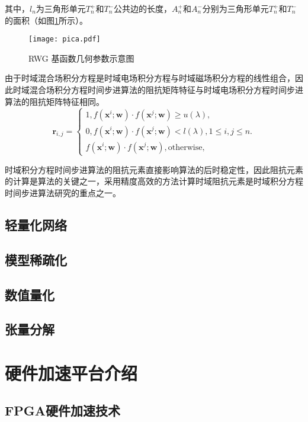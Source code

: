 其中，$l_n$为三角形单元$T_n^+$和$T_n^-$公共边的长度，$A_n^+$和$A_n^-$分别为三角形单元$T_n^+$和$T_n^-$的面积（如图\ref{pica}所示）。

\begin{figure}[h]
	\texttt{[image: pica.pdf]}
	\caption{RWG 基函数几何参数示意图}
	\label{pica}
\end{figure}

由于时域混合场积分方程是时域电场积分方程与时域磁场积分方程的线性组合，因此时域混合场积分方程时间步进算法的阻抗矩阵特征与时域电场积分方程时间步进算法的阻抗矩阵特征相同。
\begin{equation}
\label{latent_binary_variable}
\bm{r}_{i,j}=
\begin{cases}
1,f(\bm{x}^{i};\bm{w})\cdot f(\bm{x}^{j};\bm{w})\geq u(\lambda),\\
0,f(\bm{x}^{i};\bm{w})\cdot f(\bm{x}^{j};\bm{w})< l(\lambda), 1\leq i,j\leq n.\\
f(\bm{x}^{i};\bm{w})\cdot f(\bm{x}^{j};\bm{w}),\text{otherwise},
\end{cases}
\end{equation}

时域积分方程时间步进算法的阻抗元素直接影响算法的后时稳定性，因此阻抗元素的计算是算法的关键之一，采用精度高效的方法计算时域阻抗元素是时域积分方程时间步进算法研究的重点之一。


\subsection{轻量化网络}

\subsection{模型稀疏化}

\subsection{数值量化}

\subsection{张量分解}

\section{硬件加速平台介绍}

\subsection{FPGA硬件加速技术}

